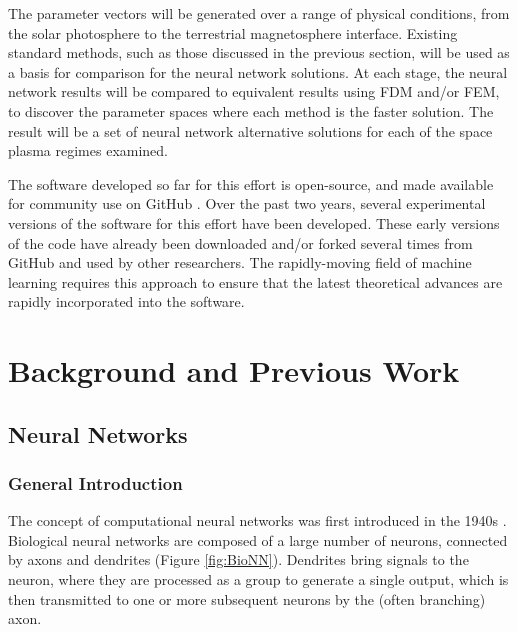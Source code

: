 \documentclass{article}
\begin{document}
The parameter vectors will be generated over a range of physical conditions, from the solar photosphere to the terrestrial magnetosphere interface. Existing standard methods, such as those discussed in the previous section, will be used as a basis for comparison for the neural network solutions. At each stage, the neural network results will be compared to equivalent results using FDM and/or FEM, to discover the parameter spaces where each method is the faster solution. The result will be a set of neural network alternative solutions for each of the space plasma regimes examined.

The software developed so far for this effort \cite{nnode} is open-source, and made available for community use on GitHub \cite{github}. Over the past two years, several experimental versions of the software for this effort have been developed. These early versions of the code have already been downloaded and/or forked several times from GitHub and used by other researchers. The rapidly-moving field of machine learning requires this approach to ensure that the latest theoretical advances are rapidly incorporated into the software.


\newpage

\section{Background and Previous Work}

\subsection{Neural Networks}

\subsubsection{General Introduction}

The concept of computational neural networks was first introduced in the 1940s \cite{McCulloch1943}. Biological neural networks are composed of a large number of neurons, connected by axons and dendrites (Figure \ref{fig:BioNN}). Dendrites bring signals to the neuron, where they are processed as a group to generate a single output, which is then transmitted to  one or more subsequent neurons by the (often branching) axon.
\end{document}
